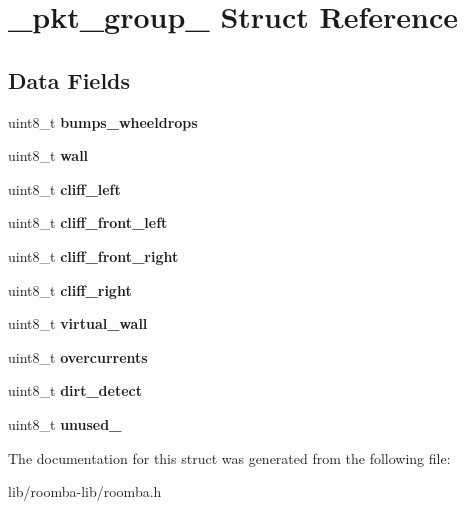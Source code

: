 \hypertarget{struct__pkt__group__1}{}\section{\+\_\+pkt\+\_\+group\+\_ Struct Reference}
\label{struct__pkt__group__1}
\subsection*{Data Fields}
\begin{DoxyCompactItemize}
\item 
\hypertarget{group__roomba-lib_gad576e2f36a82ecbb5918f424a7e17188}{}uint8\+\_\+t {\bfseries bumps\+\_\+wheeldrops}\label{group__roomba-lib_gad576e2f36a82ecbb5918f424a7e17188}

\item 
\hypertarget{group__roomba-lib_gad985091322f8602c097f7bead6b6cc65}{}uint8\+\_\+t {\bfseries wall}\label{group__roomba-lib_gad985091322f8602c097f7bead6b6cc65}

\item 
\hypertarget{group__roomba-lib_ga7cbecdcd7d0ecfc8cfc827721f4e3294}{}uint8\+\_\+t {\bfseries cliff\+\_\+left}\label{group__roomba-lib_ga7cbecdcd7d0ecfc8cfc827721f4e3294}

\item 
\hypertarget{group__roomba-lib_ga86de120f341192ccc5029f1efc5a5b45}{}uint8\+\_\+t {\bfseries cliff\+\_\+front\+\_\+left}\label{group__roomba-lib_ga86de120f341192ccc5029f1efc5a5b45}

\item 
\hypertarget{group__roomba-lib_ga5bed17d2510c78692af8ab1b676309d0}{}uint8\+\_\+t {\bfseries cliff\+\_\+front\+\_\+right}\label{group__roomba-lib_ga5bed17d2510c78692af8ab1b676309d0}

\item 
\hypertarget{group__roomba-lib_ga99123edf9a592989087c67ab8c9f317c}{}uint8\+\_\+t {\bfseries cliff\+\_\+right}\label{group__roomba-lib_ga99123edf9a592989087c67ab8c9f317c}

\item 
\hypertarget{group__roomba-lib_gaa9bd9c014a5f805b3a885caa6bcc6a82}{}uint8\+\_\+t {\bfseries virtual\+\_\+wall}\label{group__roomba-lib_gaa9bd9c014a5f805b3a885caa6bcc6a82}

\item 
\hypertarget{group__roomba-lib_ga503643688b4890f0e551f1a26b86a20d}{}uint8\+\_\+t {\bfseries overcurrents}\label{group__roomba-lib_ga503643688b4890f0e551f1a26b86a20d}

\item 
\hypertarget{group__roomba-lib_gaa264f0bbadd7e838f27060a63f203be5}{}uint8\+\_\+t {\bfseries dirt\+\_\+detect}\label{group__roomba-lib_gaa264f0bbadd7e838f27060a63f203be5}

\item 
\hypertarget{group__roomba-lib_gaf15886560f5f0117f0543358c578995a}{}uint8\+\_\+t {\bfseries unused\+\_}\label{group__roomba-lib_gaf15886560f5f0117f0543358c578995a}

\end{DoxyCompactItemize}


The documentation for this struct was generated from the following file\+:\begin{DoxyCompactItemize}
\item 
lib/roomba-\/lib/roomba.\+h\end{DoxyCompactItemize}
